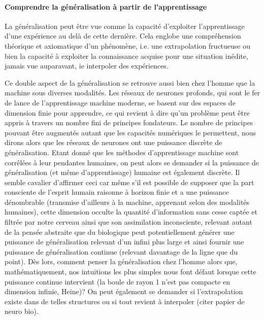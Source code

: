 \paragraph{Comprendre la généralisation à partir de l'apprentissage}
    
     La généralisation peut être vue comme la capacité d'exploiter l'apprentissage d'une expérience au delà de cette dernière. Cela englobe une compréhension théorique et axiomatique d'un phénomène, i.e. une extrapolation fructueuse ou bien la capacité à exploiter la connaissance acquise pour une situation inédite, jamais vue auparavant, ie interpoler des expériences. 
    
     Ce double aspect de la généralisation se retrouve aussi bien chez l'homme que la machine sous diverses modalités. Les réseaux de neurones profonds, qui sont le fer de lance de l'apprentissage machine moderne, se basent sur des espaces de dimension finie pour apprendre, ce qui revient à dire qu'un problème peut être appris à travers un nombre fini de principes fondateurs. Le nombre de principes pouvant être augmentés autant que les capacités numériques le permettent, nous dirons alors que les réseaux de neurones ont une puissance discrète de généralisation. Etant donné que les méthodes d'apprentissage machine sont corrêlées à leur pendantes humaines, on peut alors se demander si la puissance de généralisation (et même d'apprentissage) humaine est également discrète. Il semble cavalier d'affirmer ceci car même s'il est possible de supposer que la part consciente de l'esprit humain raisonne à horizon finie et a une puissance dénombrable (transmise d'ailleurs à la machine, apprenant selon des modalités humaines), cette dimension occulte la quantité d'information  sans cesse captée et filtrée par notre cerveau ainsi que son assimilation inconsciente, relevant autant de la pensée abstraite que du biologique peut potentiellement générer une puissance de généralisation relevant d'un infini plus large et ainsi fournir une puissance de généralisation continue (relevant davantage de la ligne que du point). Dès lors, comment penser la généralisation chez l'homme alors que, mathématiquement, nos intuitions les plus simples nous font défaut lorsque cette puissance continue intervient (la boule de rayon 1 n'est pas compacte en dimension infinie, Heine)? On peut également se demander si l'extrapolation existe dans de telles structures ou si tout revient à interpoler (citer papier de neuro bio).
    
